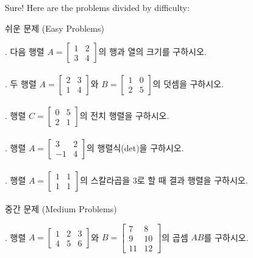 \documentclass[fleqn]{article}
\begin{document}
      
        Sure! Here are the problems divided by difficulty:

 쉬운 문제 (Easy Problems)

. 다음 행렬 \( A = \begin{bmatrix} 1 & 2 \\ 3 & 4 \end{bmatrix} \)의 행과 열의 크기를 구하시오. \\\\

. 두 행렬 \( A = \begin{bmatrix} 2 & 3 \\ 1 & 4 \end{bmatrix} \)와 \( B = \begin{bmatrix} 1 & 0 \\ 2 & 5 \end{bmatrix} \)의 덧셈을 구하시오. \\\\

. 행렬 \( C = \begin{bmatrix} 0 & 5 \\ 2 & 1 \end{bmatrix} \)의 전치 행렬을 구하시오. \\\\

. 행렬 \( A = \begin{bmatrix} 3 & 2 \\ -1 & 4 \end{bmatrix} \)의 행렬식(det)을 구하시오. \\\\

. 행렬 \( A = \begin{bmatrix} 1 & 1 \\ 1 & 1 \end{bmatrix} \)의 스칼라곱을 \( 3 \)로 할 때 결과 행렬을 구하시오. \\\\

 중간 문제 (Medium Problems)

. 행렬 \( A = \begin{bmatrix} 1 & 2 & 3 \\ 4 & 5 & 6 \end{bmatrix} \)와 \( B = \begin{bmatrix} 7 & 8 \\ 9 & 10 \\ 11 & 12 \end{bmatrix} \)의 곱셈 \( AB \)를 구하시오. \\\\
\end{document}
